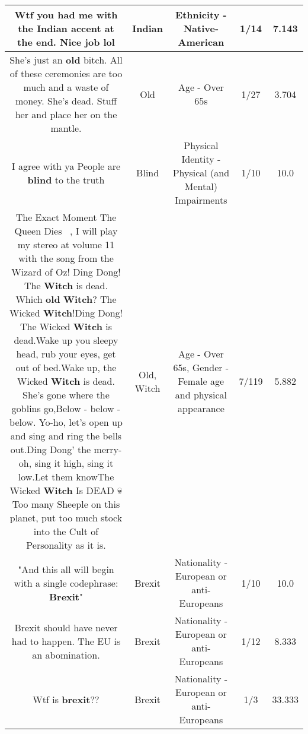 \documentclass[11pt]{article}
\newlength\mylength
\begin{document}
\begin{center}
\begin{longtable}{|C{.65\mylength}|C{.30\mylength}|C{.12\mylength}|C{.12\mylength}|C{.12\mylength}|}
  \small Wtf you had me with the \textbf{Indian} accent at the end. Nice job lol\normalsize   & Indian & Ethnicity - Native-American & 1/14 & 7.143 \\  \hline
  \small She's just an \textbf{old} bitch.  All of these ceremonies are too much and a waste of money. She's dead. Stuff her and place her on the mantle.\normalsize   & Old & Age - Over 65s & 1/27 & 3.704 \\  \hline
  \small I agree with ya People are \textbf{blind} to the truth\normalsize   & Blind & Physical Identity - Physical (and Mental) Impairments & 1/10 & 10.0 \\  \hline
  \small The Exact Moment The Queen Dies👸🏼💀, I will play my stereo at volume 11 with the song from the Wizard of Oz! Ding Dong! The \textbf{Witch} is dead. Which \textbf{old} \textbf{Witch}? The Wicked \textbf{Witch}!Ding Dong! The Wicked \textbf{Witch} is dead.Wake up you sleepy head, rub your eyes, get out of bed.Wake up, the Wicked \textbf{Witch} is dead. She's gone where the goblins go,Below - below - below. Yo-ho, let's open up and sing and ring the bells out.Ding Dong' the merry-oh, sing it high, sing it low.Let them knowThe Wicked \textbf{Witch} Is DEAD 💀 Too many Sheeple on this planet, put too much stock into the Cult of Personality as it is.\normalsize   & Old, Witch & Age - Over 65s, Gender - Female age and physical appearance & 7/119 & 5.882 \\  \hline
  \small "And this all will begin with a single codephrase: \textbf{Brexit}"\normalsize   & Brexit & Nationality - European or anti-Europeans & 1/10 & 10.0 \\  \hline
  \small Brexit should have never had to happen. The EU is an abomination.\normalsize   & Brexit & Nationality - European or anti-Europeans & 1/12 & 8.333 \\  \hline
  \small Wtf is \textbf{brexit}??\normalsize   & Brexit & Nationality - European or anti-Europeans & 1/3 & 33.333 \\  \hline

\end{longtable}
\end{center}
\end{document}
